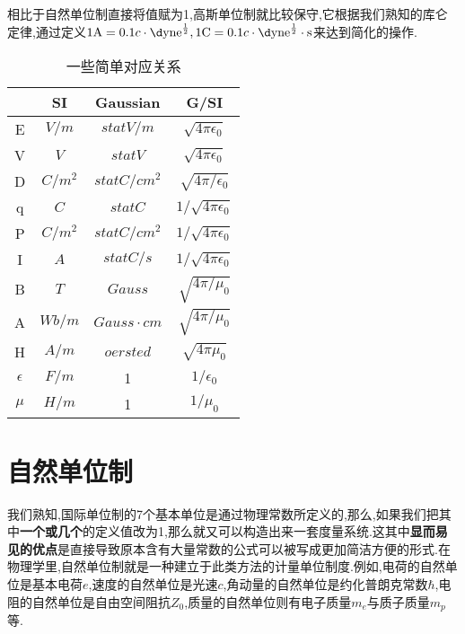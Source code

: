 相比于自然单位制直接将值赋为1,高斯单位制就比较保守,它根据我们熟知的库仑定律,通过定义$1\mathrm{A}=0.1c\cdot\mathrm{\d yne}^{\frac12},1\mathrm{C}=0.1c\cdot\rm{\d yne}^{\frac12}\cdot s$来达到简化的操作.\\
\begin{table}[htbp]
	\centering
	\caption{一些简单对应关系}
	\begin{tabular}{|c|c|c|c|}
		\hline
		& SI      & Gaussian        & G/SI                     \\ \hline
		E          & $V/m$   & $statV/m$       & $\sqrt{4\pi\epsilon_0}$  \\ \hline
		V          & $V$     & $statV$         & $\sqrt{4\pi\epsilon_0}$  \\ \hline
		D          & $C/m^2$ & $statC/cm^2$    & $\sqrt{4\pi/\epsilon_0}$ \\ \hline
		q          & $C$     & $statC$         & $1/\sqrt{4\pi\epsilon_0}$ \\ \hline
		P          & $C/m^2$ & $statC/cm^2$    & $1/\sqrt{4\pi\epsilon_0}$ \\ \hline
		I          & $A$     & $statC/s$       & $1/\sqrt{4\pi\epsilon_0}$ \\ \hline
		B          & $T$     & $Gauss$         & $\sqrt{4\pi/\mu_0}$      \\ \hline
		A          & $Wb/m$  & $Gauss\cdot cm$ & $\sqrt{4\pi/\mu_0}$      \\ \hline
		H          & $A/m$   & $oersted$       & $\sqrt{4\pi\mu_0}$       \\ \hline
		$\epsilon$ & $F/m$   & 1               & $1/\epsilon_0$           \\ \hline
		$\mu$      & $H/m$   & 1               & $1/\mu_0$                \\ \hline
	\end{tabular}
\end{table}
\section{自然单位制}
我们熟知,国际单位制的7个基本单位是通过物理常数所定义的,那么,如果我们把其中\textbf{一个或几个}的定义值改为1,那么就又可以构造出来一套度量系统.这其中\textbf{显而易见的优点}是直接导致原本含有大量常数的公式可以被写成更加简洁方便的形式.在物理学里,自然单位制就是一种建立于此类方法的计量单位制度.例如,电荷的自然单位是基本电荷${\displaystyle e}$,速度的自然单位是光速${\displaystyle c}$,角动量的自然单位是约化普朗克常数${\displaystyle \hbar }$,电阻的自然单位是自由空间阻抗${\displaystyle Z_{0}}$,质量的自然单位则有电子质量${\displaystyle m_{e}}$与质子质量${\displaystyle m_{p}}$等.\\

